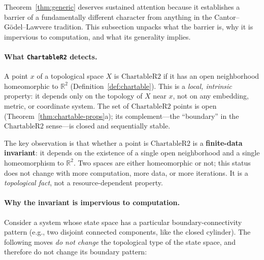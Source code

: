 \documentclass[11pt]{article}
\begin{document}
Theorem~\ref{thm:generic} deserves sustained attention because it
establishes a barrier of a fundamentally different character from
anything in the Cantor--G\"odel--Lawvere tradition.  This subsection
unpacks what the barrier is, why it is impervious to computation, and
what its generality implies.

\paragraph{What \texttt{ChartableR2} detects.}
A point $x$ of a topological space $X$ is $\mathrm{ChartableR2}$ if it
has an open neighborhood homeomorphic to $\mathbb{R}^2$
(Definition~\ref{def:chartable}).  This is a \emph{local, intrinsic}
property: it depends only on the topology of $X$ near $x$, not on any
embedding, metric, or coordinate system.  The set of
$\mathrm{ChartableR2}$ points is open (Theorem~\ref{thm:chartable-props}a);
its complement---the ``boundary'' in the $\mathrm{ChartableR2}$ sense---is
closed and sequentially stable.

The key observation is that whether a point is $\mathrm{ChartableR2}$ is a
\textbf{finite-data invariant}: it depends on the existence of a single
open neighborhood and a single homeomorphism to $\mathbb{R}^2$.  Two
spaces are either homeomorphic or not; this status does not change with
more computation, more data, or more iterations.  It is a
\emph{topological fact}, not a resource-dependent property.

\paragraph{Why the invariant is impervious to computation.}
Consider a system whose state space has a particular boundary-connectivity
pattern (e.g., two disjoint connected components, like the closed
cylinder).  The following moves \emph{do not change} the topological type
of the state space, and therefore do not change its boundary pattern:
\end{document}
